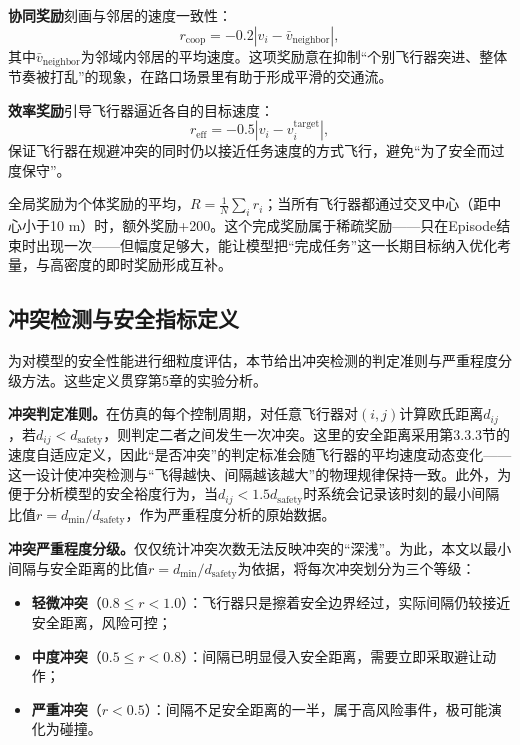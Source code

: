 \documentclass[12pt,a4paper,UTF8]{ctexart}
\begin{document}
\textbf{协同奖励}刻画与邻居的速度一致性：
\begin{equation}
    r_{\text{coop}} = -0.2\left|v_i - \bar{v}_{\text{neighbor}}\right|,
    \label{eq:reward_coop}
\end{equation}
其中$\bar{v}_{\text{neighbor}}$为邻域内邻居的平均速度。这项奖励意在抑制“个别飞行器突进、整体节奏被打乱”的现象，在路口场景里有助于形成平滑的交通流。

\textbf{效率奖励}引导飞行器逼近各自的目标速度：
\begin{equation}
    r_{\text{eff}} = -0.5\left|v_i - v_i^{\text{target}}\right|,
    \label{eq:reward_eff}
\end{equation}
保证飞行器在规避冲突的同时仍以接近任务速度的方式飞行，避免“为了安全而过度保守”。

全局奖励为个体奖励的平均，$R=\frac{1}{N}\sum_i r_i$；当所有飞行器都通过交叉中心（距中心小于10 m）时，额外奖励+200。这个完成奖励属于稀疏奖励——只在Episode结束时出现一次——但幅度足够大，能让模型把“完成任务”这一长期目标纳入优化考量，与高密度的即时奖励形成互补。

\subsection{冲突检测与安全指标定义}

为对模型的安全性能进行细粒度评估，本节给出冲突检测的判定准则与严重程度分级方法。这些定义贯穿第5章的实验分析。

\textbf{冲突判定准则。}在仿真的每个控制周期，对任意飞行器对$(i,j)$计算欧氏距离$d_{ij}$，若$d_{ij}<d_{\text{safety}}$，则判定二者之间发生一次冲突。这里的安全距离采用第3.3.3节的速度自适应定义，因此“是否冲突”的判定标准会随飞行器的平均速度动态变化——这一设计使冲突检测与“飞得越快、间隔越该越大”的物理规律保持一致。此外，为便于分析模型的安全裕度行为，当$d_{ij}<1.5d_{\text{safety}}$时系统会记录该时刻的最小间隔比值$r=d_{\min}/d_{\text{safety}}$，作为严重程度分析的原始数据。

\textbf{冲突严重程度分级。}仅仅统计冲突次数无法反映冲突的“深浅”。为此，本文以最小间隔与安全距离的比值$r=d_{\min}/d_{\text{safety}}$为依据，将每次冲突划分为三个等级：
\begin{itemize}
    \item \textbf{轻微冲突}（$0.8\leq r<1.0$）：飞行器只是擦着安全边界经过，实际间隔仍较接近安全距离，风险可控；
    \item \textbf{中度冲突}（$0.5\leq r<0.8$）：间隔已明显侵入安全距离，需要立即采取避让动作；
    \item \textbf{严重冲突}（$r<0.5$）：间隔不足安全距离的一半，属于高风险事件，极可能演化为碰撞。
\end{itemize}
\end{document}
